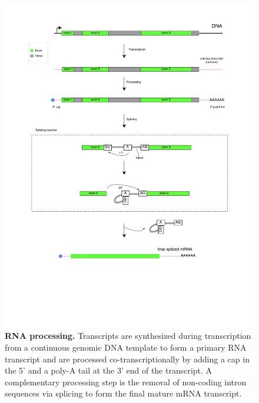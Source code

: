 \begin{figure}
	 \centering
	 \includegraphics[width=1\linewidth]{img/chapter1/rna}
	  \caption[RNA processing]{\textbf{RNA processing.} Transcripts are synthesized during transcription from a continuous genomic DNA template to form a primary RNA transcript and are processed co-transcriptionally by adding a cap in the 5' and a poly-A tail at the 3' end of the transcript. A complementary processing step is the removal of non-coding intron sequences via splicing to form the final mature mRNA transcript.}
	 \label{fig:rna}
\end{figure}

